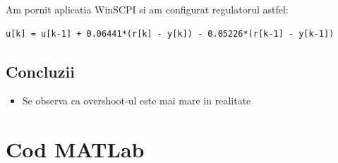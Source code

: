 \documentclass[12pt,english]{article}
\begin{document}
Am pornit aplicatia WinSCPI si am configurat regulatorul astfel:

\begin{lstlisting}
u[k] = u[k-1] + 0.06441*(r[k] - y[k]) - 0.05226*(r[k-1] - y[k-1])
\end{lstlisting}

\begin{figure}[H]
  \centering
\end{figure}

\subsection {Concluzii}
\begin{itemize}
  \item Se observa ca overshoot-ul este mai mare in realitate
\end{itemize}

\section{Cod MATLab}
% 
\end{document}
